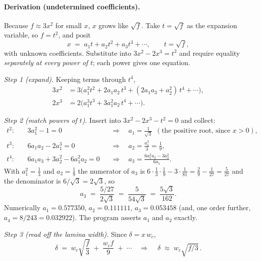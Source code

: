 \paragraph{Derivation (undetermined coefficients).} Because $f\approx 3x^2$ for small $x$,
$x$ grows like $\sqrt f$. Take $t=\sqrt f$ as the expansion variable, so $f=t^2$, and posit
\begin{equation}
x \;=\; a_1 t + a_2 t^2 + a_3 t^3 + \cdots, \qquad t = \sqrt f,
\end{equation}
with unknown coefficients. Substitute into $3x^2-2x^3 = t^2$ and require equality
\emph{separately at every power of $t$}; each power gives one equation.

\emph{Step 1 (expand).} Keeping terms through $t^4$,
\begin{align}
3x^2 &= 3\Big(a_1^2 t^2 + 2a_1 a_2\,t^3 + (2a_1 a_3 + a_2^2)\,t^4 + \cdots\Big),\\[2pt]
2x^3 &= 2\Big(a_1^3 t^3 + 3a_1^2 a_2\,t^4 + \cdots\Big).
\end{align}

\emph{Step 2 (match powers of $t$).} Insert into $3x^2 - 2x^3 - t^2 = 0$ and collect:
\begin{align}
t^2:&\quad 3a_1^2 - 1 = 0 &&\Longrightarrow\quad a_1 = \frac{1}{\sqrt3}\ \ (\text{the positive root, since } x>0),\\[2pt]
t^3:&\quad 6a_1 a_2 - 2a_1^3 = 0 &&\Longrightarrow\quad a_2 = \frac{a_1^2}{3} = \frac{1}{9},\\[2pt]
t^4:&\quad 6a_1 a_3 + 3a_2^2 - 6a_1^2 a_2 = 0 &&\Longrightarrow\quad a_3 = \frac{6a_1^2 a_2 - 3a_2^2}{6a_1}.
\end{align}
With $a_1^2=\tfrac13$ and $a_2=\tfrac19$ the numerator of $a_3$ is
$6\cdot\tfrac13\cdot\tfrac19 - 3\cdot\tfrac{1}{81} = \tfrac29 - \tfrac1{27} = \tfrac{5}{27}$ and
the denominator is $6/\sqrt3 = 2\sqrt3$, so
\begin{equation}
a_3 \;=\; \frac{5/27}{2\sqrt3} \;=\; \frac{5}{54\sqrt3} \;=\; \frac{5\sqrt3}{162}.
\end{equation}
Numerically $a_1 = 0.577350$, $a_2 = 0.111111$, $a_3 = 0.053458$ (and, one order further,
$a_4=8/243=0.032922$). The program asserts $a_1$ and $a_2$ exactly.

\emph{Step 3 (read off the lamina width).} Since $\delta = x\,w_c$,
\begin{equation}
\delta \;=\; w_c\sqrt{\frac{f}{3}} \;+\; \frac{w_c f}{9} \;+\; \cdots
\quad\Longrightarrow\quad
\boxed{\,\delta \;\approx\; w_c\sqrt{f/3}\,}.
\label{eq:r2}
\end{equation}

